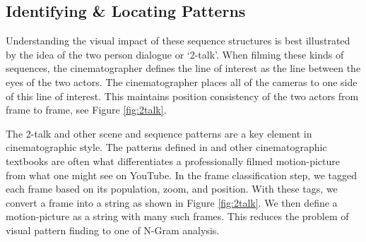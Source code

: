
\subsection*{Identifying \& Locating Patterns}
Understanding the visual impact of these sequence structures is best illustrated by the idea of the two person dialogue or `2-talk'. When filming these kinds of sequences, the cinematographer defines the line of interest as the line between the eyes of the two actors.
The cinematographer places all of the cameras to one side of this line of interest. This 
maintains position consistency of the two actors from frame to frame, see Figure \ref{fig:2talk}. 

The 2-talk and other scene and sequence patterns are a key element in cinematographic style. The patterns defined in \cite{arijon_grammar_1991} and other cinematographic textbooks are often what differentiates a professionally filmed motion-picture from what one might see on YouTube. In the frame classification step, we tagged each frame based on its population, zoom, and position. With these tags, we convert a frame into a string as shown in Figure \ref{fig:2talk}. We then define a motion-picture as a string with many such frames. This reduces the problem of visual pattern finding to one of N-Gram analysis.


